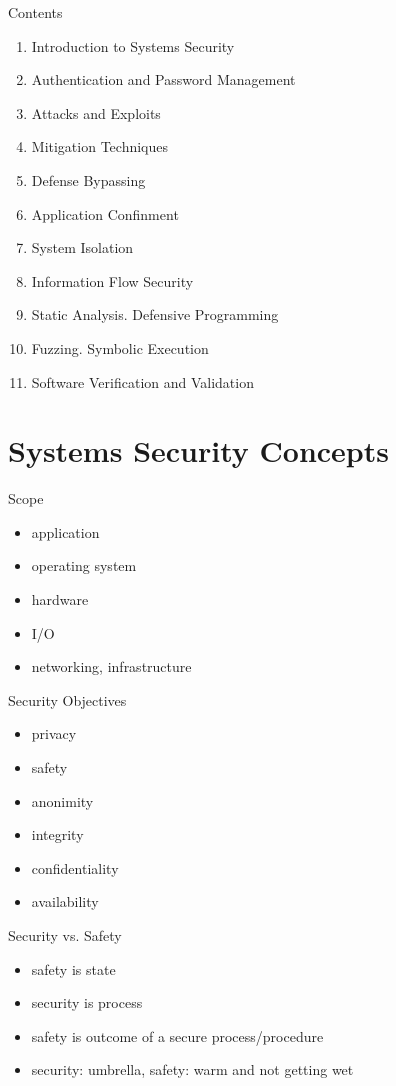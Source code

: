 \documentclass{curs}
\begin{document}
\begin{frame}{Contents}
  \begin{enumerate}
    \item Introduction to Systems Security
    \item Authentication and Password Management
    \item Attacks and Exploits
    \item Mitigation Techniques
    \item Defense Bypassing
    \item Application Confinment
    \item System Isolation
    \item Information Flow Security
    \item Static Analysis. Defensive Programming
    \item Fuzzing. Symbolic Execution
    \item Software Verification and Validation
  \end{enumerate}
\end{frame}


\section{Systems Security Concepts}

\begin{frame}{Scope}
  \begin{itemize}
    \item application
    \item operating system
    \item hardware
    \item I/O
    \item networking, infrastructure
  \end{itemize}
\end{frame}

\begin{frame}{Security Objectives}
  \begin{itemize}
    \item privacy
    \item safety
    \item anonimity
    \item integrity
    \item confidentiality
    \item availability
  \end{itemize}
\end{frame}

\begin{frame}{Security vs. Safety}
  \begin{itemize}
    \item safety is state
    \item security is process
    \item safety is outcome of a secure process/procedure
    \item security: umbrella, safety: warm and not getting wet
  \end{itemize}
\end{frame}
\end{document}

